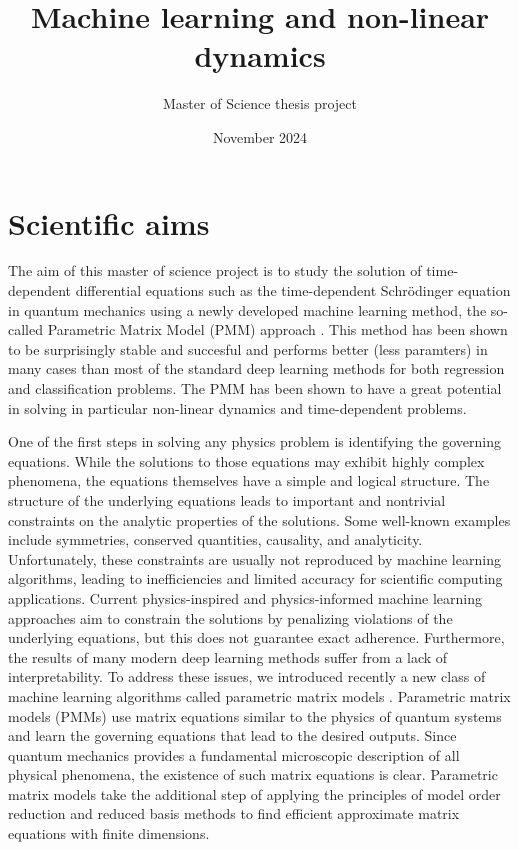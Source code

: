 \documentclass{article}
\title{Machine learning and non-linear dynamics}
\author{Master of Science thesis project}
\date{November 2024}
\begin{document}
\maketitle  

\section{Scientific aims}


The aim of this master of science project is to study the solution of
time-dependent differential equations such as the time-dependent
Schr\"odinger equation in quantum mechanics using a newly developed
machine learning method, the so-called Parametric Matrix Model (PMM)
approach \cite{us2024}. This method has been shown to be surprisingly
stable and succesful and performs better (less paramters) in many
cases than most of the standard deep learning methods for both
regression and classification problems.  The PMM has been shown to
have a great potential in solving in particular non-linear dynamics
and time-dependent problems.


One of the first steps in solving any physics problem is identifying
the governing equations.  While the solutions to those equations may
exhibit highly complex phenomena, the equations themselves have a
simple and logical structure.  The structure of the underlying
equations leads to important and nontrivial constraints on the
analytic properties of the solutions.  Some well-known examples
include symmetries, conserved quantities, causality, and analyticity.
Unfortunately, these constraints are usually not reproduced by machine
learning algorithms, leading to inefficiencies and limited accuracy
for scientific computing applications. Current physics-inspired and
physics-informed machine learning approaches aim to constrain the
solutions by penalizing violations of the underlying equations, but
this does not guarantee exact adherence.  Furthermore, the results of
many modern deep learning methods suffer from a lack of
interpretability.  To address these issues, we introduced recently a
new class of machine learning algorithms called parametric matrix
models \cite{us2024}.  Parametric matrix models (PMMs) use matrix
equations similar to the physics of quantum systems and learn the
governing equations that lead to the desired outputs.  Since quantum
mechanics provides a fundamental microscopic description of all
physical phenomena, the existence of such matrix equations is clear.
Parametric matrix models take the additional step of applying the
principles of model order reduction and reduced basis methods to find
efficient approximate matrix equations with finite dimensions.
\end{document}
